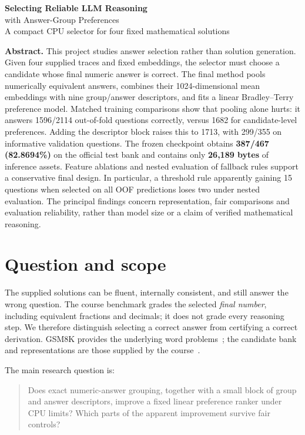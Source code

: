 \documentclass[11pt,a4paper]{article}
\newcommand{\pageheading}[1]{\section{#1}}
\begin{document}
\begin{center}
{\LARGE\bfseries\color{navy} Selecting Reliable LLM Reasoning}\\[4pt]
{\Large with Answer-Group Preferences}\\[7pt]
{\small A compact CPU selector for four fixed mathematical solutions}
\end{center}
\vspace{2pt}
\textbf{Abstract.}
This project studies answer selection rather than solution generation. Given
four supplied traces and fixed embeddings, the selector must choose a candidate
whose final numeric answer is correct. The final method pools numerically
equivalent answers, combines their 1024-dimensional mean embeddings with nine
group/answer descriptors, and fits a linear Bradley--Terry preference model.
Matched training comparisons show that pooling alone hurts: it answers
1596/2114 out-of-fold questions correctly, versus 1682 for candidate-level
preferences. Adding the descriptor block raises this to 1713, with 299/355 on
informative validation questions. The frozen checkpoint obtains
\textbf{387/467 (82.8694\%)} on the official test bank and contains only
\textbf{26,189 bytes} of inference assets. Feature ablations and nested
evaluation of fallback rules support a conservative final design. In particular,
a threshold rule apparently gaining 15 questions when selected on all OOF
predictions loses two under nested evaluation. The principal findings concern
representation, fair comparisons and evaluation reliability, rather than model
size or a claim of verified mathematical reasoning.

\pageheading{Question and scope}
The supplied solutions can be fluent, internally consistent, and still answer
the wrong question. The course benchmark grades the selected \emph{final number},
including equivalent fractions and decimals; it does not grade every reasoning
step. We therefore distinguish selecting a correct answer from certifying a
correct derivation. GSM8K provides the underlying word problems~\cite{gsm8k};
the candidate bank and representations are those supplied by the course~\cite{guide}.

The main research question is:
\begin{quote}
Does exact numeric-answer grouping, together with a small block of group and
answer descriptors, improve a fixed linear preference ranker under CPU limits?
Which parts of the apparent improvement survive fair controls?
\end{quote}
\end{document}
